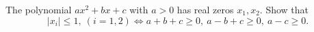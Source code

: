 The polynomial $ax^2 + bx + c$ with $a > 0$ has real zeros $x_1, x_2$. Show that
\[ |x_i| \leq 1,\ (i = 1, 2) \Leftrightarrow a + b + c \geq 0,\ a - b + c \geq 0,\ a - c \geq 0. \]
